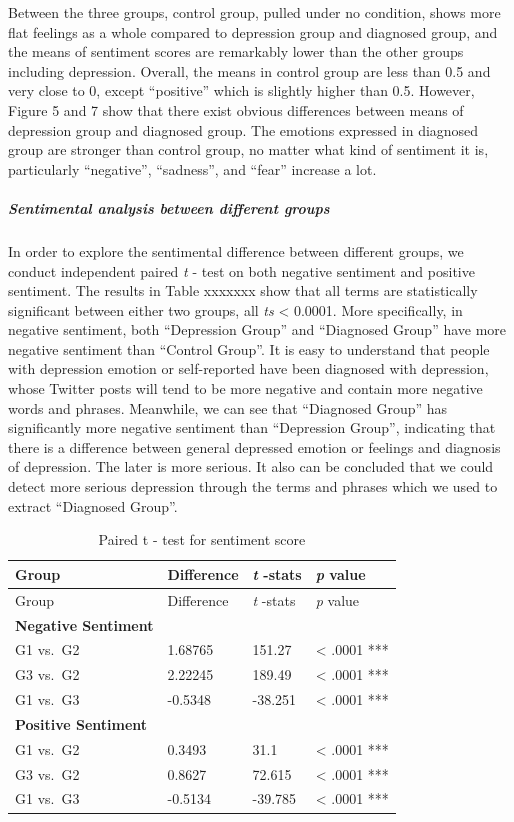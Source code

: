 \documentclass[]{article}
\let\oldsubparagraph\subparagraph
\renewcommand{\subparagraph}[1]{\oldsubparagraph{#1}\mbox{}}
\begin{document}
Between the three groups, control group, pulled under no condition,
shows more flat feelings as a whole compared to depression group and
diagnosed group, and the means of sentiment scores are remarkably lower
than the other groups including depression. Overall, the means in
control group are less than 0.5 and very close to 0, except ``positive''
which is slightly higher than 0.5. However, Figure 5 and 7 show that
there exist obvious differences between means of depression group and
diagnosed group. The emotions expressed in diagnosed group are stronger
than control group, no matter what kind of sentiment it is, particularly
``negative'', ``sadness'', and ``fear'' increase a lot.

\hypertarget{sentimental-analysis-between-different-groups}{%
\subparagraph{Sentimental analysis between different
groups}\label{sentimental-analysis-between-different-groups}}

In order to explore the sentimental difference between different groups,
we conduct independent paired \emph{t} - test on both negative sentiment
and positive sentiment. The results in Table xxxxxxx show that all terms
are statistically significant between either two groups, all \emph{ts}
\textless{} 0.0001. More specifically, in negative sentiment, both
``Depression Group'' and ``Diagnosed Group'' have more negative
sentiment than ``Control Group''. It is easy to understand that people
with depression emotion or self-reported have been diagnosed with
depression, whose Twitter posts will tend to be more negative and
contain more negative words and phrases. Meanwhile, we can see that
``Diagnosed Group'' has significantly more negative sentiment than
``Depression Group'', indicating that there is a difference between
general depressed emotion or feelings and diagnosis of depression. The
later is more serious. It also can be concluded that we could detect
more serious depression through the terms and phrases which we used to
extract ``Diagnosed Group''.

\begin{longtable}[]{@{}llll@{}}
\caption{Paired t - test for sentiment score}\tabularnewline
\toprule
Group & Difference & \emph{t} -stats & \emph{p} value\tabularnewline
\midrule
\endfirsthead
\toprule
Group & Difference & \emph{t} -stats & \emph{p} value\tabularnewline
\midrule
\endhead
\textbf{Negative Sentiment} & & &\tabularnewline
G1 vs.~G2 & 1.68765 & 151.27 & \textless{} .0001 ***\tabularnewline
G3 vs.~G2 & 2.22245 & 189.49 & \textless{} .0001 ***\tabularnewline
G1 vs.~G3 & -0.5348 & -38.251 & \textless{} .0001 ***\tabularnewline
\textbf{Positive Sentiment} & & &\tabularnewline
G1 vs.~G2 & 0.3493 & 31.1 & \textless{} .0001 ***\tabularnewline
G3 vs.~G2 & 0.8627 & 72.615 & \textless{} .0001 ***\tabularnewline
G1 vs.~G3 & -0.5134 & -39.785 & \textless{} .0001 ***\tabularnewline
\bottomrule
\end{longtable}
\end{document}
